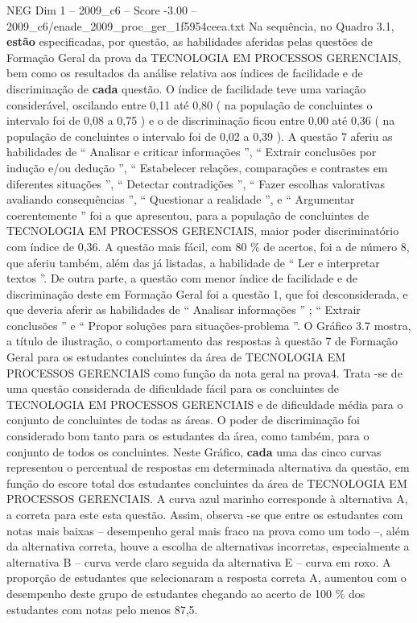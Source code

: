 \begin{textsample}{NEG Dim 1 – 2009\_c6 – Score -3.00 – 2009\_c6/enade\_2009\_proc\_ger\_1f5954ceea.txt}
Na sequência, no Quadro 3.1, \textbf{estão} especificadas, por questão, as habilidades aferidas pelas questões de Formação Geral da prova da TECNOLOGIA EM PROCESSOS GERENCIAIS, bem como os resultados da análise relativa aos índices de facilidade e de discriminação de \textbf{cada} questão.
O índice de facilidade teve uma variação considerável, oscilando entre 0,11 até 0,80 ( na população de concluintes o intervalo foi de 0,08 a 0,75 ) e o de discriminação ficou entre 0,00 até 0,36 ( na população de concluintes o intervalo foi de 0,02 a 0,39 ).
A questão 7 aferiu as habilidades de “ Analisar e criticar informações ”, “ Extrair conclusões por indução e/ou dedução ”, “ Estabelecer relações, comparações e contrastes em diferentes situações ”, “ Detectar contradições ”, “ Fazer escolhas valorativas avaliando consequências ”, “ Questionar a realidade ”, e “ Argumentar coerentemente ” foi a que apresentou, para a população de concluintes de TECNOLOGIA EM PROCESSOS GERENCIAIS, maior poder discriminatório com índice de 0,36.
A questão mais fácil, com 80 \% de acertos, foi a de número 8, que aferiu também, além das já listadas, a habilidade de “ Ler e interpretar textos ”.
De outra parte, a questão com menor índice de facilidade e de discriminação deste em Formação Geral foi a questão 1, que foi desconsiderada, e que deveria aferir as habilidades de “ Analisar informações ” ; “ Extrair conclusões ” e “ Propor soluções para situações-problema ”.
O Gráfico 3.7 mostra, a título de ilustração, o comportamento das respostas à questão 7 de Formação Geral para os estudantes concluintes da área de TECNOLOGIA EM PROCESSOS GERENCIAIS como função da nota geral na prova4.
Trata -se de uma questão considerada de dificuldade fácil para os concluintes de TECNOLOGIA EM PROCESSOS GERENCIAIS e de dificuldade média para o conjunto de concluintes de todas as áreas.
O poder de discriminação foi considerado bom tanto para os estudantes da área, como também, para o conjunto de todos os concluintes.
Neste Gráfico, \textbf{cada} uma das cinco curvas representou o percentual de respostas em determinada alternativa da questão, em função do escore total dos estudantes concluintes da área de TECNOLOGIA EM PROCESSOS GERENCIAIS.
A curva azul marinho corresponde à alternativa A, a correta para este esta questão.
Assim, observa -se que entre os estudantes com notas mais baixas – desempenho geral mais fraco na prova como um todo –, além da alternativa correta, houve a escolha de alternativas incorretas, especialmente a alternativa B – curva verde claro seguida da alternativa E – curva em roxo.
A proporção de estudantes que selecionaram a resposta correta A, aumentou com o desempenho deste grupo de estudantes chegando ao acerto de 100 \% dos estudantes com notas pelo menos 87,5.

\end{textsample}
